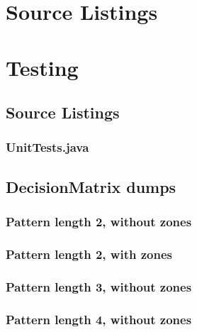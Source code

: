 \newpage
\appendix

\chapter{Source Listings}


\chapter{Testing}

\section{Source Listings}
\subsection{UnitTests.java}


\section{DecisionMatrix dumps}

\subsection{Pattern length 2, without zones}


\subsection{Pattern length 2, with zones}


\subsection{Pattern length 3, without zones}


\subsection{Pattern length 4, without zones}



